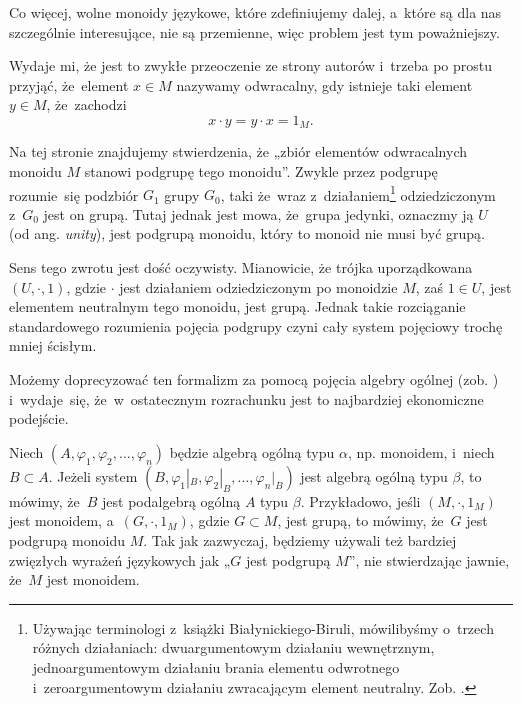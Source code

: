 \documentclass[a4paper,11pt]{article}
\begin{document}
Co więcej, wolne monoidy językowe, które zdefiniujemy dalej, a~które
są dla nas szczególnie interesujące, nie są przemienne, więc problem
jest tym poważniejszy.

Wydaje mi, że jest to zwykłe przeoczenie ze strony autorów i~trzeba po
prostu przyjąć, że~element $x \in M$ nazywamy odwracalny, gdy istnieje
taki element $y \in M$, że~zachodzi
\begin{equation}
  \label{eq:Forys-Forys-03}
  x \cdot y = y \cdot x = 1_{ M }.
\end{equation}

\vspace{\spaceFour}





 Na tej stronie znajdujemy stwierdzenia, że „zbiór
elementów odwracalnych monoidu $M$ stanowi podgrupę tego monoidu”.
Zwykle przez podgrupę rozumie~się podzbiór $G_{ 1 }$ grupy $G_{ 0 }$,
taki że~wraz z~działaniem\footnote{Używając terminologi z~książki
  Białynickiego-Biruli, mówilibyśmy o~trzech różnych działaniach:
  dwuargumentowym działaniu wewnętrznym, jednoargumentowym działaniu
  brania elementu odwrotnego i~zeroargumentowym działaniu zwracającym
  element neutralny. Zob. \cite{BialynickiBirulaZarysAlgebry1987}.}
odziedziczonym z~$G_{ 0 }$ jest on grupą. Tutaj jednak jest mowa,
że~grupa jedynki, oznaczmy ją $U$ (od ang. \textit{unity}), jest
podgrupą monoidu, który to monoid nie musi być grupą.

Sens tego zwrotu jest dość oczywisty. Mianowicie, że trójka
uporządkowana $( U, \cdot, 1 )$, gdzie $\cdot$ jest działaniem
odziedziczonym po monoidzie $M$, zaś $1 \in U$, jest elementem
neutralnym tego monoidu, jest grupą. Jednak takie rozciąganie
standardowego rozumienia pojęcia podgrupy czyni cały system pojęciowy
trochę mniej ścisłym.

Możemy doprecyzować ten formalizm za pomocą pojęcia algebry ogólnej
(zob. \cite{BialynickiBirulaZarysAlgebry1987}) i~wydaje~się,
że~w~ostatecznym rozrachunku jest to najbardziej ekonomiczne
podejście.

Niech $( A, \varphi_{ 1 }, \varphi_{ 2 }, \ldots, \varphi_{ n } )$
będzie algebrą ogólną typu $\alpha$, np. monoidem, i~niech
$B \subset A$. Jeżeli system
$( B, \varphi_{ 1 }|_{ B }, \varphi_{ 2 }|_{ B }, \ldots, \varphi_{ n
}|_{ B } )$ jest algebrą ogólną typu $\beta$, to mówimy, że~$B$ jest
podalgebrą ogólną $A$ typu $\beta$. Przykładowo, jeśli
$( M, \cdot, 1_{ M } )$ jest monoidem, a~$( G, \cdot, 1_{ M } )$,
gdzie $G \subset M$, jest grupą, to mówimy, że~$G$ jest podgrupą
monoidu $M$. Tak jak zazwyczaj, będziemy używali też bardziej
zwięzłych wyrażeń językowych jak „$G$ jest podgrupą $M$”, nie
stwierdzając jawnie, że~$M$ jest monoidem.
\end{document}
